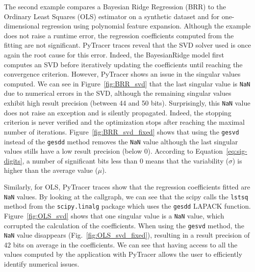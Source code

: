 \documentclass[10pt,journal,compsoc]{IEEEtran}
\newcommand{\pytracer}[0]{PyTracer\xspace}
\DeclareRobustCommand{\add}[1]{\textcolor{ao(english)}{#1}}%
\DeclareRobustCommand{\add}[1]{#1}
\begin{document}
The second example compares a Bayesian Ridge Regression (BRR) to the Ordinary
Least Squares (OLS) estimator on a synthetic dataset and for one-dimensional
regression using polynomial feature expansion. Although the example does not
raise a runtime error, the regression coefficients computed from the fitting are
not significant. \pytracer traces reveal that the SVD solver used is once again the root
cause for this error. \add{Indeed, the BayesianRidge model first computes an SVD
    before iteratively updating the coefficients until reaching the convergence
    criterion. However, PyTracer shows an issue in the singular values computed.}
\add{We can see in Figure}~\ref{fig:BRR_svd} \add{that the last singular value is
    \texttt{NaN} due to numerical errors in the SVD, although the remaining
    singular values exhibit high \add{result} precision (between 44 and 50 bits).
    Surprisingly, this \texttt{NaN} value does not raise an exception and is silently
    propagated. Indeed, the stopping criterion is never verified and the 
    optimization stops after reaching the maximal number of iterations.
    Figure}~\ref{fig:BRR_svd_fixed} \add{shows that using
    the \texttt{gesvd} instead of the \texttt{gesdd} method removes the \texttt{NaN} value
    although the last singular values stills have a low \add{result} precision (below 0).
    According to Equation}~\ref{eq:sig-digits}, \add{a number of significant bits less than 0 means that the
    variability ($\sigma$) is higher than the average value ($\mu$)}.


\add{Similarly, for OLS, PyTracer traces show that the
    regression coefficients fitted are \texttt{NaN} values. By looking at the callgraph, we can
    see that the scipy calls the \texttt{lstsq} method from the
    \texttt{scipy.linalg} package which uses the \texttt{gesdd} LAPACK function.
    Figure}~\ref{fig:OLS_svd} \add{shows that one singular value is a \texttt{NaN} value,
    which corrupted the calculation of the coefficients. When using the \texttt{gesvd} method, 
    the \texttt{NaN} value disappears 
    (Fig.}~\ref{fig:OLS_svd_fixed}\add{), resulting in a \add{result} precision of
    42 bits on average in the coefficients. We can see that having
    access to all the values computed by the application with PyTracer allows
    the user to efficiently identify numerical issues.}
\end{document}

